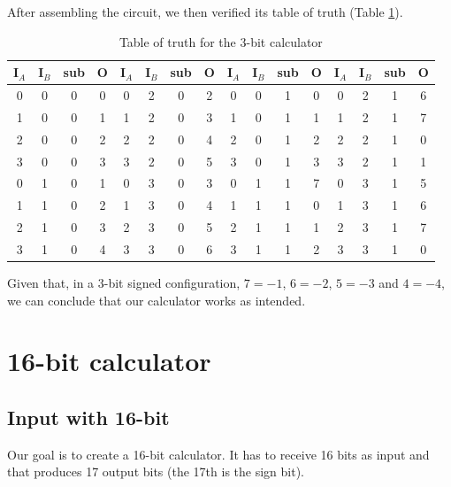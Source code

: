 \documentclass{article}
\begin{document}
After assembling the circuit, we then verified its table of truth (Table \ref{Table_calculator}).

\begin{table}[h]
  \centering
  \begin{tabular}{| c | c | c | c ||| c | c | c | c ||| c | c | c | c ||| c | c | c | c |}
  \hline
  I$_A$ & I$_B$ & sub & O & I$_A$ & I$_B$ & sub & O & I$_A$ & I$_B$ & sub & O & I$_A$ & I$_B$ & sub & O \\ \hline
  0 & 0 & 0 & 0 & 0 & 2 & 0 & 2 & 0 & 0 & 1 & 0 & 0 & 2 & 1 & 6 \\ \hline
  1 & 0 & 0 & 1 & 1 & 2 & 0 & 3 & 1 & 0 & 1 & 1 & 1 & 2 & 1 & 7 \\ \hline
  2 & 0 & 0 & 2 & 2 & 2 & 0 & 4 & 2 & 0 & 1 & 2 & 2 & 2 & 1 & 0 \\ \hline
  3 & 0 & 0 & 3 & 3 & 2 & 0 & 5 & 3 & 0 & 1 & 3 & 3 & 2 & 1 & 1 \\ \hline
  0 & 1 & 0 & 1 & 0 & 3 & 0 & 3 & 0 & 1 & 1 & 7 & 0 & 3 & 1 & 5 \\ \hline
  1 & 1 & 0 & 2 & 1 & 3 & 0 & 4 & 1 & 1 & 1 & 0 & 1 & 3 & 1 & 6 \\ \hline
  2 & 1 & 0 & 3 & 2 & 3 & 0 & 5 & 2 & 1 & 1 & 1 & 2 & 3 & 1 & 7 \\ \hline
  3 & 1 & 0 & 4 & 3 & 3 & 0 & 6 & 3 & 1 & 1 & 2 & 3 & 3 & 1 & 0 \\ \hline
  \end{tabular}
  \caption{Table of truth for the 3-bit calculator}
  \label{Table_calculator}
\end{table}

Given that, in a 3-bit signed configuration, $7=-1$, $6=-2$, $5=-3$ and $4=-4$, we can conclude that our calculator works as intended.

\clearpage





\clearpage

\section{16-bit calculator} \label{SimulatedCalculator}



\subsection{Input with 16-bit}

Our goal is to create a 16-bit calculator. It has to receive 16 bits as input and that produces 17 output bits (the 17th is the sign bit).
\end{document}
